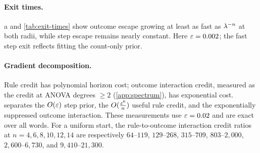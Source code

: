 \paragraph{Exit times.} a and \cref{tab:exit-times} show outcome escape growing at least as fast as
$\lambda^{-n}$ at both radii, while step escape remains nearly constant. Here $\initscale=0.002$; the fast step exit reflects fitting the
count-only prior.

\begin{table}[H]
\centering\small
{}
\caption{\textbf{Outcome escape grows exponentially while step escape stays nearly constant.} $\initscale=0.002$, zero readout;
ranges are over three draws.}
\label{tab:exit-times}
\end{table}
\paragraph{Gradient decomposition.} Rule credit has polynomial horizon cost; outcome interaction credit, measured as the credit at ANOVA degrees $\ge2$ (\cref{app:spectrum}), has exponential cost.
 separates the $O(\varepsilon)$ step prior, the $O(\frac{\varepsilon^6}{n})$ useful rule credit, and the exponentially
suppressed outcome interaction. These measurements use $\varepsilon=0.02$ and are exact over all words.
For a uniform start, the rule-to-outcome interaction credit ratios at $n=4,6,8,10,12,14$ are respectively
$64$--$119$, $129$--$268$, $315$--$709$, $803$--$2{,}000$, $2{,}600$--$6{,}730$, and $9{,}410$--$21{,}300$.

